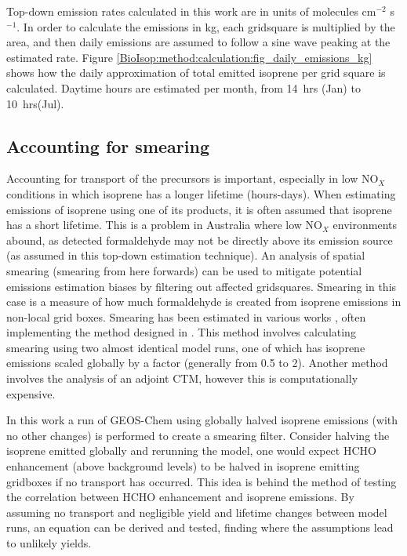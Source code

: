     Top-down emission rates calculated in this work are in units of molecules cm$^{-2}$ s$^{-1}$.
    In order to calculate the emissions in kg, each gridsquare is multiplied by the area, and then daily emissions are assumed to follow a sine wave peaking at the estimated rate.
    Figure \ref{BioIsop:method:calculation:fig_daily_emissions_kg} shows how the daily approximation of total emitted isoprene per grid square is calculated. 
    Daytime hours are estimated per month, from 14~hrs (Jan) to 10~hrs(Jul).
    
    
  
  \subsection{Accounting for smearing}
    \label{BioIsop:method:Smearing}
    
    Accounting for transport of the precursors is important, especially in low NO$_X$ conditions in which isoprene has a longer lifetime (hours-days).
    When estimating emissions of isoprene using one of its products, it is often assumed that isoprene has a short lifetime.
    This is a problem in Australia where low NO$_X$ environments abound, as detected formaldehyde may not be directly above its emission source (as assumed in this top-down estimation technique).
    An analysis of spatial smearing (smearing from here forwards) can be used to mitigate potential emissions estimation biases by filtering out affected gridsquares.
    Smearing in this case is a measure of how much formaldehyde is created from isoprene emissions in non-local grid boxes.
    Smearing has been estimated in various works \parencite[eg.][]{Martin2003, Palmer2003, Millet2006, Stavrakou2009, Marais2012, Barkley2013, Zhu2014, Wolfe2016, Surl2018}, often implementing the method designed in \textcite{Palmer2003}.
    This method involves calculating smearing using two almost identical model runs, one of which has isoprene emissions scaled globally by a factor (generally from 0.5 to 2).
    Another method \parencite[eg.][]{Stavrakou2009} involves the analysis of an adjoint CTM, however this is computationally expensive.
    
    In this work a run of GEOS-Chem using globally halved isoprene emissions (with no other changes) is performed to create a smearing filter.
    Consider halving the isoprene emitted globally and rerunning the model, one would expect HCHO enhancement (above background levels) to be halved in isoprene emitting gridboxes if no transport has occurred.
    This idea is behind the method of testing the correlation between HCHO enhancement and isoprene emissions.
    By assuming no transport and negligible yield and lifetime changes between model runs, an equation can be derived and tested, finding where the assumptions lead to unlikely yields.
    

